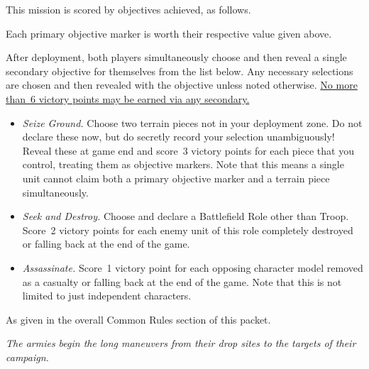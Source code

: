 \documentclass{40k}
\newcommand{\tertiaries}{\missionsubheading{Tertiary Objectives.}

As given in the overall Common Rules section of this packet.}
\begin{document}




This mission is scored by objectives achieved, as follows.

  Each primary objective marker
is worth their respective value given above.



After deployment, both players simultaneously choose and then reveal a
single secondary objective for themselves from the list below.  Any
necessary selections are chosen and then revealed with the objective
unless noted otherwise.  \underline{No more than~6 victory points may
  be earned via any secondary.}

\begin{itemize}
\item \textit{Seize Ground.}  Choose two terrain pieces not in your
  deployment zone.  Do not declare these now, but do secretly record
  your selection unambiguously!  Reveal these at game end and score~3
  victory points for each piece that you control, treating them as
  objective markers.  Note that this means a single unit cannot claim
  both a primary objective marker and a terrain piece simultaneously.

\item \textit{Seek and Destroy.}  Choose and declare a Battlefield
  Role other than Troop.  Score~2 victory points for each enemy unit
  of this role completely destroyed or falling back at the end of the
  game.

\item \textit{Assassinate.}  Score~1 victory point for each opposing
  character model removed as a casualty or falling back at the end of
  the game.  Note that this is not limited to just independent
  characters.
\end{itemize}

\tertiaries


\clearpage
{}

\centerline{\emph{The armies begin the long maneuvers from their drop
    sites to the targets of their campaign.}}

\end{document}

